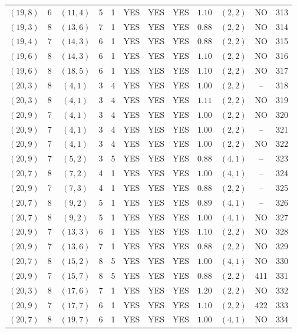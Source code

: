 \begin{longtable}{|c|c|c|c|c|c|c|c|c|c|c|c|}
$(19,8)$ & 6 & $(11,4)$ & 5 & 1 & YES & YES & YES & $1.10$ & $(2,2)$ & NO & 313\\
$(19,3)$ & 8 & $(13,6)$ & 7 & 1 & YES & YES & YES & $0.88$ & $(2,2)$ & NO & 314\\
$(19,4)$ & 7 & $(14,3)$ & 6 & 1 & YES & YES & YES & $0.88$ & $(2,2)$ & NO & 315\\
$(19,6)$ & 8 & $(14,3)$ & 6 & 1 & YES & YES & YES & $1.10$ & $(2,2)$ & NO & 316\\
$(19,6)$ & 8 & $(18,5)$ & 6 & 1 & YES & YES & YES & $1.10$ & $(2,2)$ & NO & 317\\
$(20,3)$ & 8 & $(4,1)$ & 3 & 4 & YES & YES & YES & $1.00$ & $(2,2)$ & -- & 318\\
$(20,3)$ & 8 & $(4,1)$ & 3 & 4 & YES & YES & YES & $1.11$ & $(2,2)$ & NO & 319\\
$(20,9)$ & 7 & $(4,1)$ & 3 & 4 & YES & YES & YES & $1.00$ & $(2,2)$ & NO & 320\\
$(20,9)$ & 7 & $(4,1)$ & 3 & 4 & YES & YES & YES & $1.00$ & $(2,2)$ & -- & 321\\
$(20,9)$ & 7 & $(4,1)$ & 3 & 4 & YES & YES & YES & $1.00$ & $(2,2)$ & NO & 322\\
$(20,9)$ & 7 & $(5,2)$ & 3 & 5 & YES & YES & YES & $0.88$ & $(4,1)$ & -- & 323\\
$(20,7)$ & 8 & $(7,2)$ & 4 & 1 & YES & YES & YES & $1.00$ & $(4,1)$ & -- & 324\\
$(20,9)$ & 7 & $(7,3)$ & 4 & 1 & YES & YES & YES & $0.88$ & $(2,2)$ & -- & 325\\
$(20,7)$ & 8 & $(9,2)$ & 5 & 1 & YES & YES & YES & $0.89$ & $(4,1)$ & -- & 326\\
$(20,7)$ & 8 & $(9,2)$ & 5 & 1 & YES & YES & YES & $1.00$ & $(4,1)$ & NO & 327\\
$(20,9)$ & 7 & $(13,3)$ & 6 & 1 & YES & YES & YES & $1.10$ & $(2,2)$ & NO & 328\\
$(20,9)$ & 7 & $(13,6)$ & 7 & 1 & YES & YES & YES & $0.88$ & $(2,2)$ & NO & 329\\
$(20,7)$ & 8 & $(15,2)$ & 8 & 5 & YES & YES & YES & $1.00$ & $(4,1)$ & NO & 330\\
$(20,9)$ & 7 & $(15,7)$ & 8 & 5 & YES & YES & YES & $0.88$ & $(2,2)$ & 411 & 331\\
$(20,3)$ & 8 & $(17,6)$ & 7 & 1 & YES & YES & YES & $1.20$ & $(2,2)$ & NO & 332\\
$(20,9)$ & 7 & $(17,7)$ & 6 & 1 & YES & YES & YES & $1.10$ & $(2,2)$ & 422 & 333\\
$(20,7)$ & 8 & $(19,7)$ & 6 & 1 & YES & YES & YES & $1.00$ & $(4,1)$ & NO & 334\\

\end{longtable}
